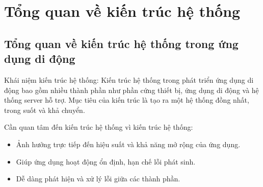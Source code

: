 
\section{Tổng quan về kiến trúc hệ thống}
    \subsection{Tổng quan về kiến trúc hệ thống trong ứng dụng di động}
    \renewcommand{\labelitemi}{--}    
    \begin{flushleft}
            \hspace*{0.8cm}Khái niệm kiến trúc hệ thống: Kiến trúc hệ thống trong phát triển ứng dụng di động bao gồm nhiều thành phần như phần cứng thiết bị, ứng dụng di động và hệ thống server hỗ trợ. Mục tiêu của kiến trúc là tạo ra một hệ thống đồng nhất, trong suốt và khả chuyển.
    \end{flushleft}

    \begin{flushleft}
        \hspace*{0.8cm}Cần quan tâm đến kiến trúc hệ thống vì kiến trúc hệ thống:
        \setlength{\leftmargini}{1.5cm}
        \begin{itemize}
            \item Ảnh hưởng trực tiếp đến hiệu suất và khả năng mở rộng của ứng dụng.
            \item Giúp ứng dụng hoạt động ổn định, hạn chế lỗi phát sinh.
            \item Dễ dàng phát hiện và xử lý lỗi giữa các thành phần.
        \end{itemize}
    \end{flushleft}

